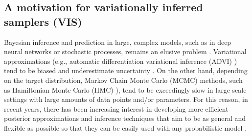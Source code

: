 \subsection{A motivation for variationally inferred samplers (VIS)}
Bayesian inference and prediction in large, complex models, such as in 
deep neural networks or stochastic processes, remains an elusive problem \parencite{blei2017variational,insua2012bayesian,alquier2020approximate}.
%
%
%
Variational approximations (e.g., automatic differentiation variational inference (ADVI) \parencite{kucukelbir2017automatic}) tend to be biased and 
underestimate uncertainty \parencite{riquelme2018failure}. 
On the other hand, depending on the target distribution,
Markov Chain Monte Carlo (MCMC) \parencite{andrieu2010particle} 
methods, such 
as Hamiltonian Monte Carlo (HMC) \parencite{neal2011mcmc}),   
tend to be exceedingly slow  \parencite{van2018simple} {in large scale settings with large amounts of data points and/or parameters}. For this reason, in recent years, there has been increasing interest in developing more efficient posterior approximations \parencite{nalisnick2016approximate,salimans2015markov,tran2015variational} and inference techniques that aim to be as general and flexible as possible {so that they can be easily used with any probabilistic model} \parencite{wood2014new, ge2018t}.

